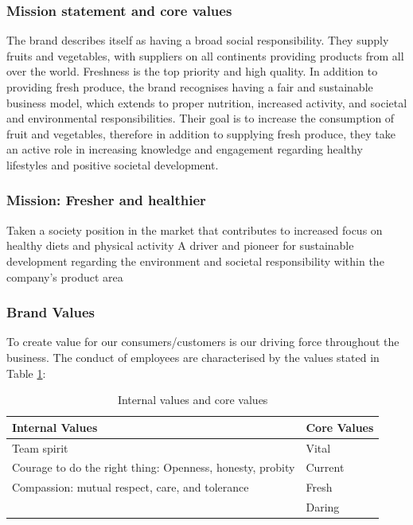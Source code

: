 \vspace{2,5mm}
    
        \subsubsection{Mission statement and core values}
 
        The brand describes itself as having a broad social responsibility. They supply fruits and vegetables, with suppliers on all continents providing products from all over the world. Freshness is the top priority and high quality. In addition to providing fresh produce, the brand recognises having a fair and sustainable business model, which extends to proper nutrition, increased activity, and societal and environmental responsibilities. Their goal is to increase the consumption of fruit and vegetables, therefore in addition to supplying fresh produce, they take an active role in increasing knowledge and engagement regarding healthy lifestyles and positive societal development.
 
\vspace{2,5mm}
  
        \subsubsection{Mission: Fresher and healthier}
        Taken a society position in the  market that contributes to increased focus on healthy diets and physical activity
        A driver and pioneer for sustainable development regarding the environment and societal responsibility within the company’s product area
        
\vspace{2,5mm}

        \subsubsection{Brand Values}
        
        To create value for our consumers/customers is our driving force throughout the business. The conduct of employees are characterised by the values stated in Table \ref{table:1}:
        
    \begin{table}[h]
    \begin{tabular}{ |p{9cm}||p{}|  }
     \hline
     Internal Values & Core Values \\
     \hline
        Team spirit & Vital \\
        Courage to do the right thing: Openness, honesty, probity & Current\\
        Compassion: mutual respect, care, and tolerance & Fresh \\
        & Daring    \\
     \hline
    \end{tabular}
    \caption{Internal values and core values}
    \label{table:1}
    \end{table}

